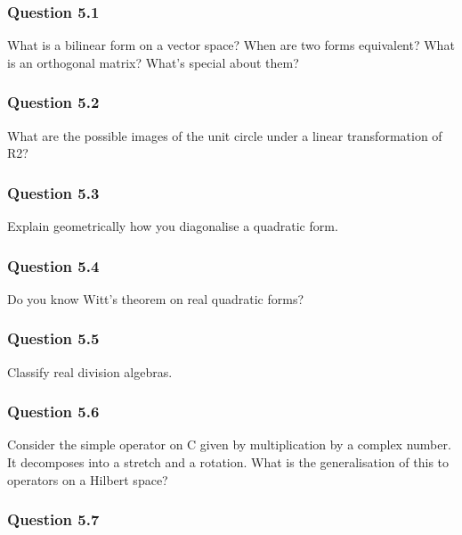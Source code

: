 \hypertarget{question-5.1}{%
\subsubsection{Question 5.1}\label{question-5.1}}

What is a bilinear form on a vector space? When are two forms
equivalent? What is an orthogonal matrix? What's special about them?

\hypertarget{question-5.2}{%
\subsubsection{Question 5.2}\label{question-5.2}}

What are the possible images of the unit circle under a linear
transformation of R2?

\hypertarget{question-5.3}{%
\subsubsection{Question 5.3}\label{question-5.3}}

Explain geometrically how you diagonalise a quadratic form.

\hypertarget{question-5.4}{%
\subsubsection{Question 5.4}\label{question-5.4}}

Do you know Witt's theorem on real quadratic forms?

\hypertarget{question-5.5}{%
\subsubsection{Question 5.5}\label{question-5.5}}

Classify real division algebras.

\hypertarget{question-5.6}{%
\subsubsection{Question 5.6}\label{question-5.6}}

Consider the simple operator on C given by multiplication by a complex
number. It decomposes into a stretch and a rotation. What is the
generalisation of this to operators on a Hilbert space?

\hypertarget{question-5.7}{%
\subsubsection{Question 5.7}\label{question-5.7}}


